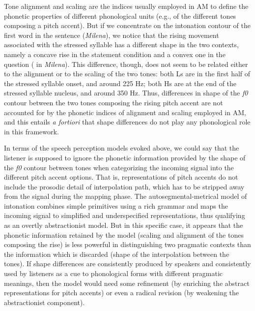 Tone alignment and scaling are the indices usually employed in AM to define the phonetic properties of different phonological units (e.g., of the different tones composing a pitch accent). But if we concentrate on the intonation contour of the first word in the sentence (\textit{Milena}), we notice that the rising movement associated with the stressed syllable has a different shape in the two contexts, namely a concave rise in the statement condition and a convex one in the question ( in \textit{Milena}). This difference, though, does not seem to be related either to the alignment or to the scaling of the two tones: both Ls are in the first half of the stressed syllable onset, and around 225 Hz; both Hs are at the end of the stressed syllable nucleus, and around 350 Hz. Thus, differences in shape of the \textit{f0} contour between the two tones composing the rising pitch accent are not accounted for by the phonetic indices of alignment and scaling employed in AM, and this entails \textit{a fortiori} that shape differences do not play any phonological role in this framework.

In terms of the speech perception models evoked above, we could say that the listener is supposed to ignore the phonetic information provided by the shape of the \textit{f0} contour between tones when categorizing the incoming signal into the different pitch accent options. That is, representations of pitch accents do not include the prosodic detail of interpolation path, which has to be stripped away from the signal during the mapping phase. The autosegmental-metrical model of intonation combines simple primitives using a rich grammar and maps the incoming signal to simplified and underspecified representations, thus qualifying as an overtly abstractionist model. But in this specific case, it appears that the phonetic information retained by the model (scaling and alignment of the tones composing the rise) is less powerful in distinguishing two pragmatic contexts than the information which is discarded (shape of the interpolation between the tones). If shape differences are consistently produced by speakers and consistently used by listeners as a cue to phonological forms with different pragmatic meanings, then the model would need some refinement (by enriching the abstract representations for pitch accents) or even a radical revision (by weakening the abstractionist component).

